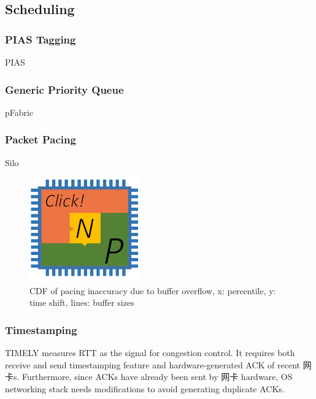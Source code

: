 {\subsection{Scheduling}

\subsubsection{PIAS Tagging}

PIAS \cite{bai2014pias}

\subsubsection{Generic Priority Queue}

pFabric \cite{alizadeh2013pfabric}

\subsubsection{Packet Pacing}

Silo \cite{jang2015silo}

\begin{figure}[h!]
	\centering
	\includegraphics[width=0.6\columnwidth]{image/logo}
	\vspace{-0.15in}
	\caption{CDF of pacing inaccuracy due to buffer overflow, x: percentile, y: time shift, lines: buffer sizes}
	\vspace{-0.15in}
	\label{clicknp:fig:PacingAccuracy}
\end{figure}

\subsubsection{Timestamping}

TIMELY \cite{mittal2015timely} measures RTT as the signal for congestion control. It requires both receive and send timestamping feature and hardware-generated ACK of recent 网卡s. Furthermore, since ACKs have already been sent by 网卡 hardware, OS networking stack needs modifications to avoid generating duplicate ACKs.

}
